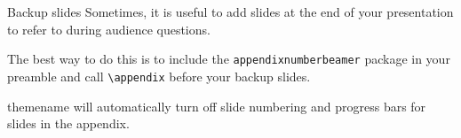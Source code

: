\documentclass{beamer}
\begin{document}
\begin{frame}[fragile]{Backup slides}
  Sometimes, it is useful to add slides at the end of your presentation to
  refer to during audience questions.

  The best way to do this is to include the \verb|appendixnumberbeamer|
  package in your preamble and call \verb|\appendix| before your backup slides.

  themename will automatically turn off slide numbering and progress bars for
  slides in the appendix.
\end{frame}
\end{document}
